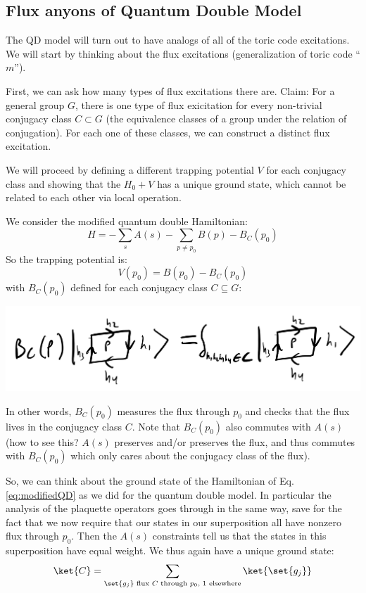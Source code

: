 \subsection{Flux anyons of Quantum Double Model}
The QD model will turn out to have analogs of all of the toric code excitations. We will start by thinking about the flux excitations (generalization of toric code ``$m$'').

First, we can ask how many types of flux excitations there are. Claim: For a general group $G$, there is one type of flux exicitation for every non-trivial conjugacy class $C \subset G$ (the equivalence classes of a group under the relation of conjugation). For each one of these classes, we can construct a distinct flux excitation.

We will proceed by defining a different trapping potential $V$ for each conjugacy class and showing that the $H_0 + V$ has a unique ground state, which cannot be related to each other via local operation.

We consider the modified quantum double Hamiltonian:
\begin{equation}\label{eq:modifiedQD}
    H = -\sum_s A(s) - \sum_{p \neq p_0}B(p) - B_C(p_0)
\end{equation}
So the trapping potential is:
\begin{equation}
    V(p_0) = B(p_0)- B_C(p_0)
\end{equation}
with $B_C(p_0)$ defined for each conjugacy class $C \subseteq G$:

\begin{center}
    \includegraphics[scale=0.35]{Lectures/Images/lec8-Bcp.png}
\end{center}

In other words, $B_C(p_0)$ measures the flux through $p_0$ and checks that the flux lives in the conjugacy class $C$. Note that $B_C(p_0)$ also commutes with $A(s)$ (how to see this? $A(s)$ preserves and/or preserves the flux, and thus commutes with $B_C(p_0)$ which only cares about the conjugacy class of the flux).

So, we can think about the ground state of the Hamiltonian of Eq. \eqref{eq:modifiedQD} as we did for the quantum double model. In particular the analysis of the plaquette operators goes through in the same way, save for the fact that we now require that our states in our superposition all have nonzero flux through $p_0$. Then the $A(s)$ constraints tell us that the states in this superposition have equal weight. We thus again have a unique ground state:
\begin{equation}
    \ket{C} = \sum_{\set{g_j} \text{ flux $C$ through $p_0$, 1 elsewhere}} \ket{\set{g_j}}
\end{equation}

